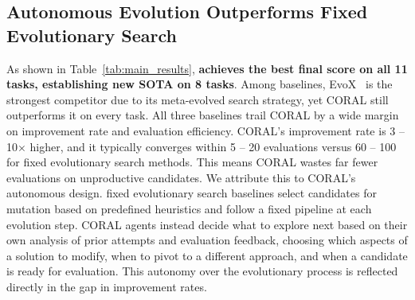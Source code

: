 \subsection{Autonomous Evolution Outperforms Fixed Evolutionary Search}
\label{sec:exp_main_single}

As shown in Table~\ref{tab:main_results}, \method{} \textbf{achieves the best final score on all 11 tasks, establishing new SOTA on 8 tasks}. Among baselines, EvoX~\citep{liu2026evox} is the strongest competitor due to its meta-evolved search strategy, yet CORAL still outperforms it on every task. All three baselines trail CORAL by a wide margin on improvement rate and evaluation efficiency. CORAL's improvement rate is 3 -- 10$\times$ higher, and it typically converges within 5 -- 20 evaluations versus 60 -- 100 for fixed evolutionary search methods. This means CORAL wastes far fewer evaluations on unproductive candidates. We attribute this to CORAL's autonomous design. fixed evolutionary search baselines select candidates for mutation based on predefined heuristics and follow a fixed pipeline at each evolution step. CORAL agents instead decide what to explore next based on their own analysis of prior attempts and evaluation feedback, choosing which aspects of a solution to modify, when to pivot to a different approach, and when a candidate is ready for evaluation. This autonomy over the evolutionary process is reflected directly in the gap in improvement rates.


